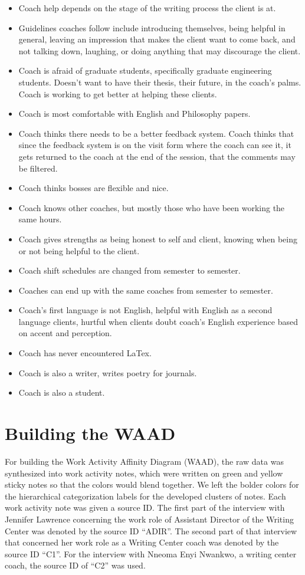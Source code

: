 \documentclass[12pt]{article} %
\begin{document}
\begin{itemize}
    \item Coach help depends on the stage of the writing process the client is at.
    \item Guidelines coaches follow include introducing themselves, being helpful in general, leaving an impression that makes the client want to come back, and not talking down, laughing, or doing anything that may discourage the client.
    \item Coach is afraid of graduate students, specifically graduate engineering students.  Doesn’t want to have their thesis, their future, in the coach’s palms.  Coach is working to get better at helping these clients.
    \item Coach is most comfortable with English and Philosophy papers. 
    \item Coach thinks there needs to be a better feedback system.  Coach thinks that since the feedback system is on the visit form where the coach can see it, it gets returned to the coach at the end of the session, that the comments may be filtered.
    \item Coach thinks bosses are flexible and nice.
    \item Coach knows other coaches, but mostly those who have been working the same hours.
    \item Coach gives strengths as being honest to self and client, knowing when being or not being helpful to the client.
    \item Coach shift schedules are changed from semester to semester.
    \item Coaches can end up with the same coaches from semester to semester.
    \item Coach’s first language is not English, helpful with English as a second language clients, hurtful when clients doubt coach’s English experience based on accent and perception. 
    \item Coach has never encountered LaTex.
    \item Coach is also a writer, writes poetry for journals.
    \item Coach is also a student.
  \end{itemize}

\section{Building the WAAD} %
  For building the Work Activity Affinity Diagram (WAAD), the raw data was synthesized into work activity notes, which were written on green and yellow sticky notes so that the colors would blend together.
  We left the bolder colors for the hierarchical categorization labels for the developed clusters of notes.  Each work activity note was given a source ID.
  The first part of the interview with Jennifer Lawrence concerning the work role of Assistant Director of the Writing Center was denoted by the source ID “ADIR”.
  The second part of that interview that concerned her work role as a Writing Center coach was denoted by the source ID “C1”.
  For the interview with Nneoma Enyi Nwankwo, a writing center coach, the source ID of “C2” was used. 
\end{document}
